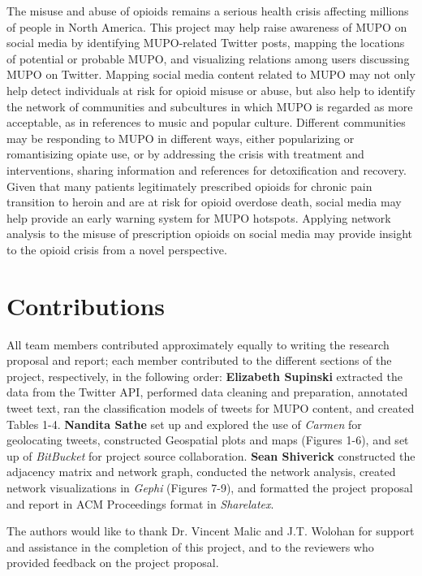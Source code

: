 \documentclass[sigconf]{acmart}
\begin{document}
The misuse and abuse of opioids remains a serious health crisis affecting 
millions of people in North America. This project may help raise awareness 
of MUPO on social media by identifying MUPO-related Twitter posts, mapping 
the locations of potential or probable MUPO, and visualizing relations among 
users discussing MUPO on Twitter. Mapping social media content related to MUPO 
may not only help detect individuals at risk for opioid misuse or abuse, but 
also help to identify the network of communities and subcultures in which MUPO 
is regarded as more acceptable, as in references to music and popular culture. 
Different communities may be responding to MUPO in different ways, either 
popularizing or romantisizing opiate use, or by addressing the crisis with 
treatment and interventions, sharing information and references for 
detoxification and recovery. Given that many patients legitimately prescribed 
opioids for chronic pain transition to heroin and are at risk for opioid 
overdose death, social media may help provide an early warning system for MUPO 
hotspots. Applying network analysis to the misuse of prescription opioids on 
social media may provide insight to the opioid crisis from a novel perspective. 
 

\section{Contributions}

All team members contributed approximately equally to writing the research 
proposal and report; each member contributed to the different sections of 
the project, respectively, in the following order: \textbf{Elizabeth Supinski} 
extracted the data from the Twitter API, performed data cleaning and 
preparation, annotated tweet text, ran the classification models of tweets 
for MUPO content, and created Tables 1-4. \textbf{Nandita Sathe} set up and 
explored the use of \emph{Carmen} for geolocating tweets, constructed 
Geospatial plots and maps (Figures 1-6), and set up of \emph{BitBucket} for 
project source collaboration. \textbf{Sean Shiverick} constructed the adjacency 
matrix and network graph, conducted the network analysis, created network 
visualizations in \emph{Gephi} (Figures 7-9), and formatted the project proposal
and report in ACM Proceedings format in \emph{Sharelatex}.

\begin{acks}
  The authors would like to thank Dr. Vincent Malic and J.T. Wolohan 
  for support and assistance in the completion of this project, and to 
  the reviewers who provided feedback on the project proposal.
\end{acks}


 




%
\end{document}
